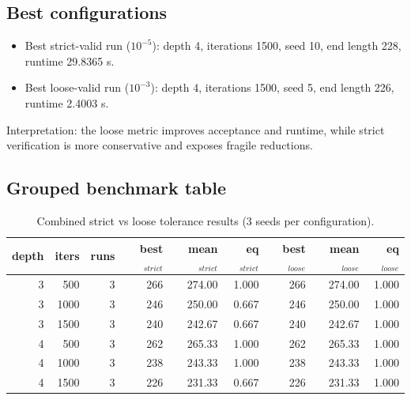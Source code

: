 \documentclass[11pt,a4paper]{article}
\begin{document}
\subsection{Best configurations}
\begin{itemize}
    \item Best strict-valid run ($10^{-5}$): depth 4, iterations 1500, seed 10, end length 228, runtime 29.8365 s.
    \item Best loose-valid run ($10^{-3}$): depth 4, iterations 1500, seed 5, end length 226, runtime 2.4003 s.
\end{itemize}

Interpretation: the loose metric improves acceptance and runtime, while strict verification is more conservative and exposes fragile reductions.

\subsection{Grouped benchmark table}
\begin{table}[H]
\centering
\caption{Combined strict vs loose tolerance results (3 seeds per configuration).}
\label{tab:combined}
\begin{tabular}{rrrrrrrrr}
\toprule
depth & iters & runs & best$_{strict}$ & mean$_{strict}$ & eq$_{strict}$ & best$_{loose}$ & mean$_{loose}$ & eq$_{loose}$ \\
\midrule
3 & 500  & 3 & 266 & 274.00 & 1.000 & 266 & 274.00 & 1.000 \\
3 & 1000 & 3 & 246 & 250.00 & 0.667 & 246 & 250.00 & 1.000 \\
3 & 1500 & 3 & 240 & 242.67 & 0.667 & 240 & 242.67 & 1.000 \\
4 & 500  & 3 & 262 & 265.33 & 1.000 & 262 & 265.33 & 1.000 \\
4 & 1000 & 3 & 238 & 243.33 & 1.000 & 238 & 243.33 & 1.000 \\
4 & 1500 & 3 & 226 & 231.33 & 0.667 & 226 & 231.33 & 1.000 \\
\bottomrule
\end{tabular}
\end{table}
\end{document}
